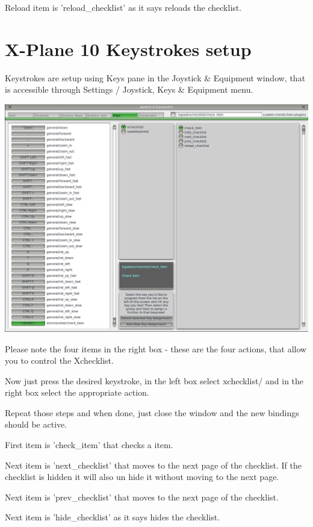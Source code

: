 \documentclass[11pt,parskip=half,a4paper]{scrartcl}
\begin{document}
Reload item is 'reload\_checklist' as it says reloads the checklist.

\newpage
\section{X-Plane 10 Keystrokes setup}
Keystrokes are setup using Keys pane in the Joystick \& Equipment window, that is accessible through 
Settings / Joystick, Keys \& Equipment menu.

\begin{center}
\includegraphics[width=17cm]{XchecklistUserManual-img002.png}
\end{center}

Please note the four items in the right box - these are the four actions, that allow you to control the 
Xchecklist. 

Now just press the desired keystroke, in the left box select xchecklist/ and in the right box select the 
appropriate action. 

Repeat those steps and when done, just close the window and the new bindings should be active. 

First item is 'check\_item' that checks a item. 

Next item is 'next\_checklist' that moves to the next page of the checklist. If the checklist is hidden it 
will also un hide it without moving to the next page. 

Next item is 'prev\_checklist' that moves to the next page of the checklist.

Next item is 'hide\_checklist' as it says hides the checklist.
\end{document}

